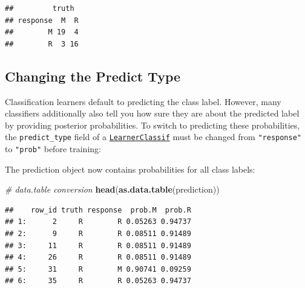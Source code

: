 \documentclass[]{scrbook}
\newenvironment{Shaded}{\begin{snugshade}}{\end{snugshade}}
\newcommand{\CommentTok}[1]{\textcolor[rgb]{0.56,0.35,0.01}{\textit{#1}}}
\newcommand{\DataTypeTok}[1]{\textcolor[rgb]{0.13,0.29,0.53}{#1}}
\newcommand{\KeywordTok}[1]{\textcolor[rgb]{0.13,0.29,0.53}{\textbf{#1}}}
\newcommand{\NormalTok}[1]{#1}
\newcommand{\OperatorTok}[1]{\textcolor[rgb]{0.81,0.36,0.00}{\textbf{#1}}}
\newcommand{\StringTok}[1]{\textcolor[rgb]{0.31,0.60,0.02}{#1}}
\renewenvironment{Shaded} {\begin{snugshade}\small} {\end{snugshade}}
\begin{document}
\begin{verbatim}
##         truth
## response  M  R
##        M 19  4
##        R  3 16
\end{verbatim}

\hypertarget{predict-type}{%
\subsection{Changing the Predict Type}\label{predict-type}}

Classification learners default to predicting the class label.
However, many classifiers additionally also tell you how sure they are about the predicted label by providing posterior probabilities.
To switch to predicting these probabilities, the \texttt{predict\_type} field of a \href{https://mlr3.mlr-org.com/reference/LearnerClassif.html}{\texttt{LearnerClassif}} must be changed from \texttt{"response"} to \texttt{"prob"} before training:

\begin{Shaded}
\end{Shaded}

The prediction object now contains probabilities for all class labels:

\begin{Shaded}
\begin{Highlighting}[]
\CommentTok{# data.table conversion}
\KeywordTok{head}\NormalTok{(}\KeywordTok{as.data.table}\NormalTok{(prediction))}
\end{Highlighting}
\end{Shaded}

\begin{verbatim}
##    row_id truth response  prob.M  prob.R
## 1:      2     R        R 0.05263 0.94737
## 2:      9     R        R 0.08511 0.91489
## 3:     11     R        R 0.08511 0.91489
## 4:     26     R        R 0.08511 0.91489
## 5:     31     R        M 0.90741 0.09259
## 6:     35     R        R 0.05263 0.94737
\end{verbatim}
\end{document}
